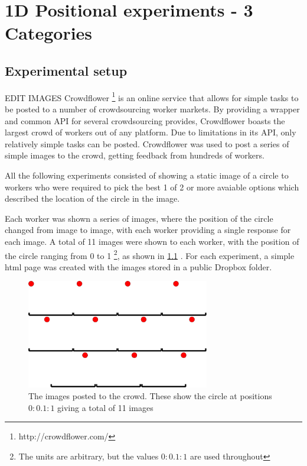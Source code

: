 \chapter{1D Positional experiments - 3 Categories} \label{Chapter: 1DPosition}

\newlength\figureheight
\newlength\figurewidth


\section{Experimental setup}
EDIT IMAGES
Crowdflower \footnote{ http://crowdflower.com/} is an online service that allows for simple tasks to be posted to a number of crowdsourcing worker markets. 
By providing a wrapper and common API for several crowdsourcing provides, Crowdflower boasts the largest crowd of workers out of any platform. 
Due to limitations in its API, only relatively simple tasks can be posted. 
Crowdflower was used to post a series of simple images to the crowd, getting feedback from hundreds of workers.

All the following experiments consisted of showing a static image of a circle to workers who were required to pick the best 1 of 2 or more avaiable options which described the location of the circle in the image. 

Each worker was shown a series of images, where the position of the circle changed from image to image, with each worker providing a single response for each image. 
A total of 11 images were shown to each worker, with the position of the circle ranging from 0 to 1 \footnote{The units are arbitrary, but the values $0:0.1:1$ are used throughout}, as shown in \ref{Figure:1d_position_images} . 
For each experiment, a simple html page was created with the images stored in a public Dropbox folder. 


\begin{figure}
  \centering
  \includegraphics[width=8cm]{combined_1d_images.png}
  \caption{The images posted to the crowd. These show the circle at positions $0:0.1:1$ giving a total of 11 images }
  \label{Figure:1d_position_images}
\end{figure}

